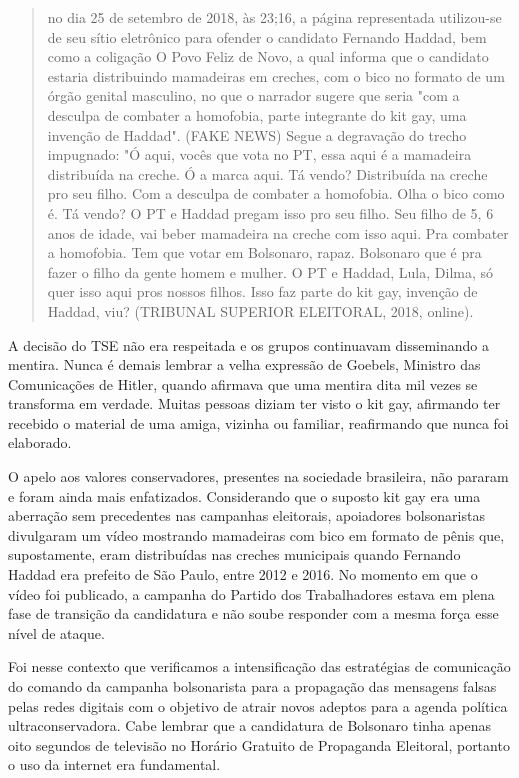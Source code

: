 \begin{quote}
no dia 25 de setembro de 2018, às 23;16, a página representada
utilizou-se de seu sítio eletrônico para ofender o candidato Fernando
Haddad, bem como a coligação O Povo Feliz de Novo, a qual informa que o
candidato estaria distribuindo mamadeiras em creches, com o bico no
formato de um órgão genital masculino, no que o narrador sugere que
seria "com a desculpa de combater a homofobia, parte integrante do kit
gay, uma invenção de Haddad". (FAKE NEWS) Segue a degravação do trecho
impugnado: "Ó aqui, vocês que vota no PT, essa aqui é a mamadeira
distribuída na creche. Ó a marca aqui. Tá vendo? Distribuída na creche
pro seu filho. Com a desculpa de combater a homofobia. Olha o bico como
é. Tá vendo? O PT e Haddad pregam isso pro seu filho. Seu filho de 5, 6
anos de idade, vai beber mamadeira na creche com isso aqui. Pra combater
a homofobia. Tem que votar em Bolsonaro, rapaz. Bolsonaro que é pra
fazer o filho da gente homem e mulher. O PT e Haddad, Lula, Dilma, só
quer isso aqui pros nossos filhos. Isso faz parte do kit gay, invenção
de Haddad, viu? (TRIBUNAL SUPERIOR ELEITORAL, 2018, online).
\end{quote}

A decisão do TSE não era respeitada e os grupos continuavam disseminando
a mentira. Nunca é demais lembrar a velha expressão de Goebels, Ministro
das Comunicações de Hitler, quando afirmava que uma mentira dita mil
vezes se transforma em verdade. Muitas pessoas diziam ter visto o kit
gay, afirmando ter recebido o material de uma amiga, vizinha ou
familiar, reafirmando que nunca foi elaborado.

O apelo aos valores conservadores, presentes na sociedade brasileira,
não pararam e foram ainda mais enfatizados. Considerando que o suposto
kit gay era uma aberração sem precedentes nas campanhas eleitorais,
apoiadores bolsonaristas divulgaram um vídeo mostrando mamadeiras com
bico em formato de pênis que, supostamente, eram distribuídas nas
creches municipais quando Fernando Haddad era prefeito de São Paulo,
entre 2012 e 2016. No momento em que o vídeo foi publicado, a campanha
do Partido dos Trabalhadores estava em plena fase de transição da
candidatura e não soube responder com a mesma força esse nível de
ataque.

Foi nesse contexto que verificamos a intensificação das estratégias de
comunicação do comando da campanha bolsonarista para a propagação das
mensagens falsas pelas redes digitais com o objetivo de atrair novos
adeptos para a agenda política ultraconservadora. Cabe lembrar que a
candidatura de Bolsonaro tinha apenas oito segundos de televisão no
Horário Gratuito de Propaganda Eleitoral, portanto o uso da internet era
fundamental.

